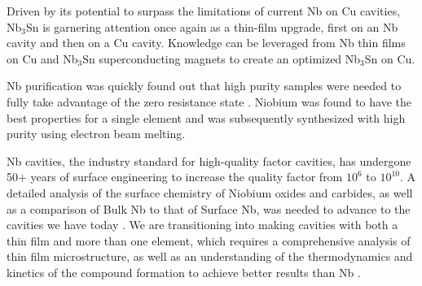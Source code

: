     Driven by its potential to surpass the limitations of current Nb on Cu cavities, Nb$_3$Sn is garnering attention once again as a thin-film upgrade, first on an Nb cavity and then on a Cu cavity. Knowledge can be leveraged from Nb thin films on Cu and Nb$_3$Sn superconducting magnets to create an optimized Nb$_3$Sn on Cu.
    
    Nb purification was quickly found out that high purity samples were needed to fully take advantage of the zero resistance state \cite{schirberSuperconductivityEnsuremathAlpha1961}. Niobium was found to have the best properties for a single element \cite{autlerHighFieldSuperconductivityNiobium1962} and was subsequently synthesized with high purity using electron beam melting\cite{Finnemore:1966zz}.
       
    
    
    Nb cavities, the industry standard for high-quality factor cavities, has undergone 50+ years of surface engineering to increase the quality factor from $10^6$ to $10^{10}$. A detailed analysis of the surface chemistry of Niobium oxides and carbides, as well as a comparison of Bulk Nb to that of Surface Nb, was needed to advance to the cavities we have today \cite{chetriMethodologyCharacterizationSurface2023}. We are transitioning into making cavities with both a thin film and more than one element, which requires a comprehensive analysis of thin film microstructure, as well as an understanding of the thermodynamics and kinetics of the compound formation to achieve better results than Nb \cite{Sun:2023ejj}.


    
